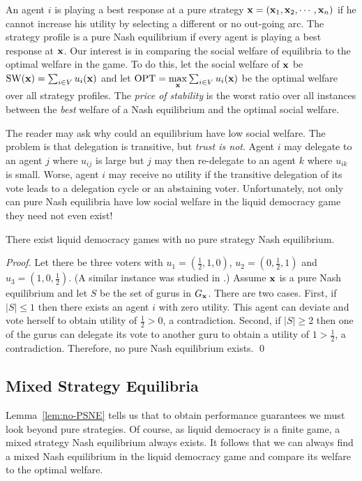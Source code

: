 An agent $i$ is playing a best response at a pure strategy ${\bf x}=({\bf x}_1, {\bf x}_2, \cdots, {\bf x}_n)$ if he cannot increase
his utility by selecting a different or no out-going arc. The strategy profile is a pure Nash equilibrium if every agent is
playing a best response at ${\bf x}$. 
Our interest is in comparing the social welfare of equilibria to the optimal welfare in the game.
To do this, let the social welfare of ${\bf x}$ be $\operatorname{SW}({\bf x}) = \sum_{i\in V} u_i({\bf x})$ and let 
$\operatorname{OPT}=\max\limits_{{\bf x}} \sum_{i\in V} u_i({\bf x})$ be the optimal welfare over all strategy profiles. 
The {\em price of stability} is the worst ratio over all instances between the {\em best} welfare of a Nash equilibrium
and the optimal social welfare. %

The reader may ask why could an equilibrium have low social welfare. The problem is that delegation is transitive, but {\em trust is not}.
 Agent $i$ may delegate to an agent $j$ where $u_{ij}$ is large but $j$ may then re-delegate to an agent $k$ where $u_{ik}$ is small.
Worse, agent $i$ may receive no utility if the transitive delegation of its vote leads to a delegation cycle or an abstaining voter.
 Unfortunately, not only can pure Nash equilibria have low social welfare in the liquid democracy game they need not even exist!
 \begin{lem}\label{lem:no-PSNE}
There exist liquid democracy games with no pure strategy Nash equilibrium. 
\end{lem}
\begin{proof}
Let there be three voters with $u_1=(\frac{1}{2},1,0)$, $u_2=(0,\frac{1}{2},1)$ and $u_3=(1,0,\frac{1}{2})$. 
(A similar instance was studied in \cite{EGP19}.) Assume ${\bf x}$ is a pure Nash equilibrium and let $S$ be the set of gurus 
in $G_{{\bf x}}$. There are two cases.
First, if $|S|\leq 1$ then there exists an agent $i$ with zero utility. This agent can deviate and vote herself to 
obtain utility of $\frac{1}{2}>0$, a contradiction. 
Second, if $|S|\geq 2$ then one of the gurus can delegate its vote to another guru to obtain a utility of $1> \frac{1}{2}$, a contradiction.
Therefore, no pure Nash equilibrium exists. \qed 
\end{proof}


\subsection{Mixed Strategy Equilibria}\label{sec:MSNE}

Lemma~\ref{lem:no-PSNE} tells us that to obtain performance guarantees we must look beyond pure strategies.
Of course, as liquid democracy is a finite game, a mixed strategy Nash equilibrium always exists.
It follows that we can always find a mixed Nash equilibrium in the liquid democracy game and compare
its welfare to the optimal welfare.

